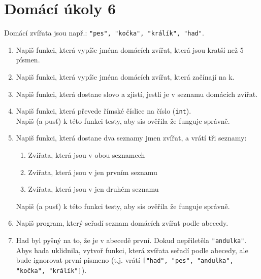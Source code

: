 \documentclass[a4paper,10pt]{article}
\newcommand\plsetno{6}
\begin{document}
\section*{Domácí úkoly \plsetno}

Domácí zvířata jsou např.: \verb+"pes", "kočka", "králík", "had"+.

\begin{enumerate}

\item Napiš funkci, která vypíše jména domácích zvířat, která jsou kratší než 5 písmen.

\item Napiš funkci, která vypíše jména domácích zvířat, která začínají na k.

\item Napiš funkci, která dostane slovo a zjistí,
    jestli je v seznamu domácích zvířat.

\item Napiš funkci, která převede římské číslice na číslo (\verb+int+).
    \\Napiš (a pusť) k této funkci testy, aby sis ověřila že funguje správně.

\item Napiš funkci, která dostane dva seznamy jmen zvířat, a vrátí tři seznamy:
    \begin{enumerate}
        \item Zvířata, která jsou v obou seznamech
        \item Zvířata, která jsou v jen prvním seznamu
        \item Zvířata, která jsou v jen druhém seznamu
    \end{enumerate}
    Napiš (a pusť) k této funkci testy, aby sis ověřila že funguje správně.

\item Napiš program, který seřadí seznam domácích zvířat podle abecedy.

\item Had byl pyšný na to, že je v abecedě první.
    Dokud nepřiletěla \verb+"andulka"+.
    \\Abys hada uklidnila, vytvoř funkci, která zvířata seřadí podle abecedy,
    ale bude ignorovat první písmeno (t.j. vrátí
        \texttt{["h{\color{plpink}ad}",
                 "p{\color{plpink}es}",
                 "a{\color{plpink}ndulka}",
                 "k{\color{plpink}očka}",
                 "k{\color{plpink}rálík}"]}).


\end{enumerate}
\end{document}
